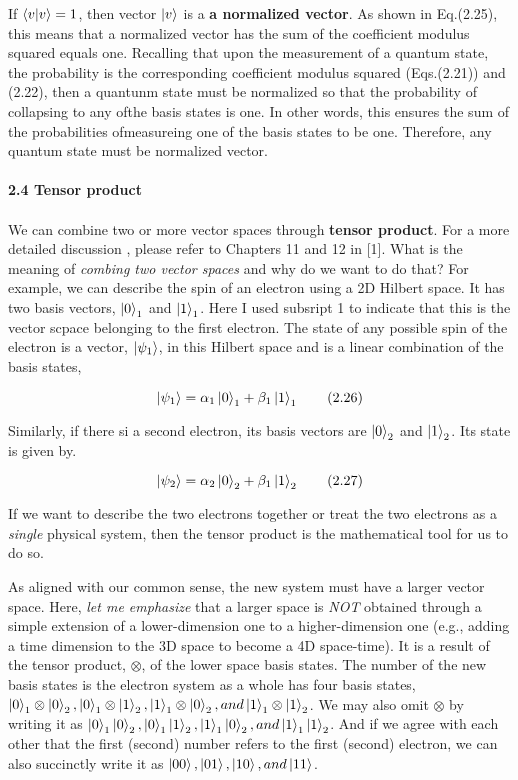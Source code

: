 \documentclass{article}
\begin{document}
If $\braket{v|v} = 1$, then vector $\ket{v}$ is a \textbf{a normalized vector}.
As shown in Eq.(2.25), this means that a normalized vector has the sum of the coefficient modulus squared
equals one. Recalling that upon the measurement of a quantum state, the probability is the corresponding
coefficient modulus squared (Eqs.(2.21)) and (2.22), then a
quantunm state must be normalized so that the probability of collapsing to any ofthe basis states is one. 
In other words, this ensures the sum of the probabilities ofmeasureing one of the basis states to be one. 
Therefore, any quantum state must be normalized vector.
\\
\\
\textbf{\large 2.4 Tensor product}
\\
\\
We can combine two or more vector spaces through \textbf{tensor product}.
For a more detailed discussion , please refer to Chapters 11 and 12 in [1].
What is the meaning of \textit{combing two vector spaces} and why do we want to do that?
For example, we can describe the spin of an electron using a 2D Hilbert space.
It has two basis vectors, $\ket{0}_{1}$ and $\ket{1}_{1}$. Here I used subsript 1 to
indicate that this is the vector scpace belonging to the first electron. 
The state of any possible spin of the electron is a vector, $\ket{\psi_{1}}$, in this Hilbert
space and is a linear combination of the basis states,

\begin{equation}
    \ket{\psi_{1}}= \alpha_{1}\ket{0}_{1}+\beta_{1}\ket{1}_{1} \tag{2.26}
\end{equation}

Similarly, if there si a second electron, its basis vectors are $\ket{0}_{2}$ and $\ket{1}_{2}$.
Its state is given by.

\begin{equation}
    \ket{\psi_{2}}= \alpha_{2}\ket{0}_{2}+\beta_{1}\ket{1}_{2} \tag{2.27}
\end{equation}

If we want to describe the two electrons together or treat the two electrons as a \textit{single} physical
system, then the tensor product is the mathematical tool for us to do so.


As aligned with our common sense, the new system must have a larger vector space. Here, \textit{let me emphasize} that a larger
space is \textit{NOT} obtained through a simple extension of a lower-dimension one to a higher-dimension one (e.g., adding a time
dimension to the 3D space to become a 4D space-time).
It is a result of the tensor product, $\otimes$, of the lower space basis states. The number of the new basis states is the electron system as  a whole has four basis states,
$\ket{0}_{1}\otimes\ket{0}_{2}, \ket{0}_{1}\otimes\ket{1}_{2}, \ket{1}_{1}\otimes\ket{0}_{2}, and \ket{1}_{1}\otimes\ket{1}_{2}$. We may also omit $\otimes$ by writing it as
$\ket{0}_{1}\ket{0}_{2}, \ket{0}_{1}\ket{1}_{2}, \ket{1}_{1}\ket{0}_{2}, and \ket{1}_{1}\ket{1}_{2}$. And if we agree with each other that the first (second) number refers to the first (second)
electron, we can also succinctly write it as $\ket{00},\ket{01}, \ket{10}, and \ket{11}$.
\end{document}
